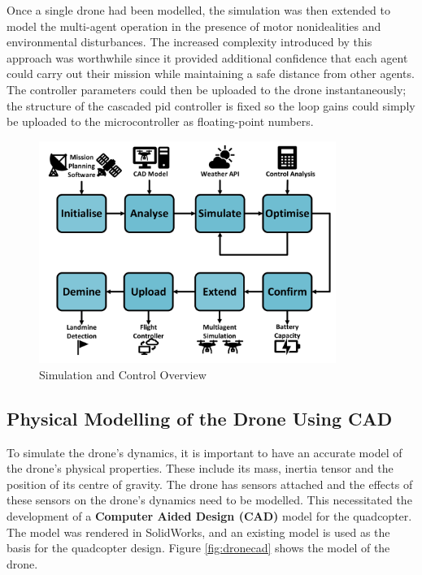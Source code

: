 Once a single drone had been modelled, the simulation was then extended to model the multi-agent operation in the presence of motor nonidealities and environmental disturbances. The increased complexity introduced by this approach was worthwhile since it provided additional confidence that each agent could carry out their mission while maintaining a safe distance from other agents. The controller parameters could then be uploaded to the drone instantaneously; the structure of the cascaded \acrshort{pid} controller is fixed so the loop gains could simply be uploaded to the microcontroller as floating-point numbers.



\begin{figure}[H]
\centering
\includegraphics[width=0.86\textwidth]{figs/Samuel/Figures/Sim and Control Overview BASIC1.pdf}
\caption{Simulation and Control Overview}
\label{fig:simctrloverview}
\end{figure}





\subsection{Physical Modelling of the Drone Using CAD}
\label{cad}

To simulate the drone's dynamics, it is important to have an accurate model of the drone's physical properties. These include its mass, inertia tensor and the position of its centre of gravity. The drone has sensors attached and the effects of these sensors on the drone's dynamics need to be modelled. This necessitated the development of a \textbf{Computer Aided Design (CAD)} model for the quadcopter. The model was rendered in SolidWorks, and an existing model \cite{westin2019x4} is used as the basis for the quadcopter design. Figure \ref{fig:dronecad} shows the model of the drone. 

